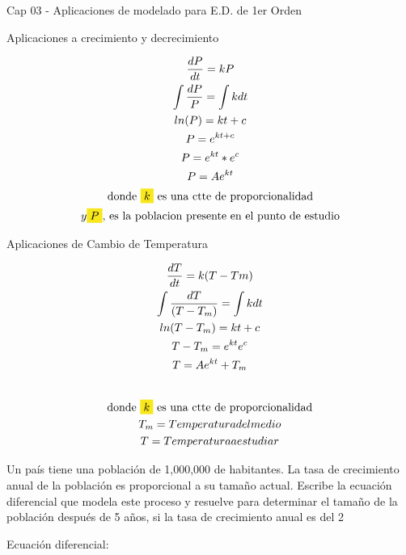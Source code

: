 \documentclass{article}
\begin{document}
Cap 03 - Aplicaciones de modelado para E.D. de 1er Orden



Aplicaciones a crecimiento y decrecimiento


\begin{gather*}
\frac{dP}{dt} = kP \\
\int \frac{dP}{P} = \int kdt \\
ln(P) = kt +c \\
P = e^{kt+c} \\
P=e^{kt}*e^{c} \\
P = Ae^{kt} \\
\text{donde }\text{\colorbox[RGB]{248,231,28}{$k$}}\text{ es una ctte de proporcionalidad} \\
y \text{\colorbox[RGB]{248,231,28}{$P$}}\text{, es la poblacion presente en el punto de estudio}
\end{gather*}


Aplicaciones de Cambio de Temperatura




\begin{gather*}
\frac{dT}{dt} = k(T-Tm) \\
\int \frac{dT}{(T-T_{m})} = \int kdt \\
ln(T-T_{m}) = kt +c \\
T-T_{m} = e^{kt}e^{c} \\
T = Ae^{kt}+T_{m} \\
\vspace{0.5em} \\
\text{donde }\text{\colorbox[RGB]{248,231,28}{$k$}}\text{ es una ctte de proporcionalidad} \\
T_{m} = Temperatura del medio \\
T = Temperatura a estudiar
\end{gather*}




Un país tiene una población de 1,000,000 de habitantes. La tasa de crecimiento anual de la población es proporcional a su tamaño actual. Escribe la ecuación diferencial que modela este proceso y resuelve para determinar el tamaño de la población después de 5 años, si la tasa de crecimiento anual es del 2%



Ecuación diferencial:
\end{document}
